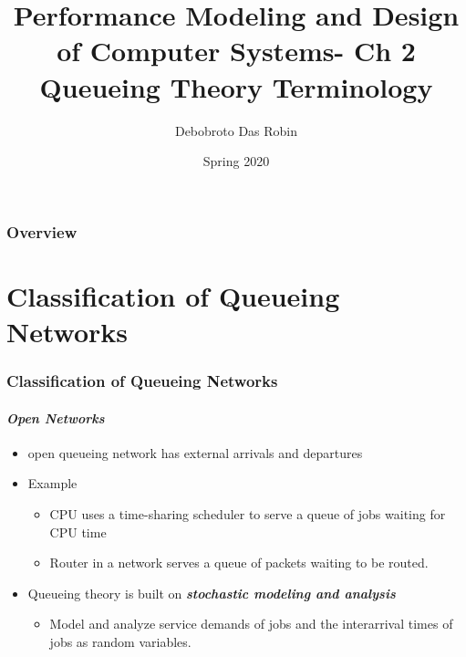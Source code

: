 \documentclass{beamer}
\title{Performance Modeling and
Design of Computer Systems- Ch 2 \\
Queueing Theory Terminology}
\author{Debobroto Das Robin} %
\institute{Kent State University}
\date{Spring 2020}
\begin{document}
\begin{frame}
        \titlepage
        \begin{center}
    \href{mailto:drobin@kent.edu}{}
        \end{center}
\end{frame}

\begin{frame}
\frametitle{Overview} %
\tableofcontents %
\end{frame}
\section{Classiﬁcation of Queueing Networks}

\begin{frame}
    \frametitle{Classiﬁcation of Queueing Networks}
    \framesubtitle{\textbf{\textit{Open Networks}}}
	\begin{itemize}
		\item open queueing network has external arrivals and departures
		\item Example
			\begin{itemize}
			\item CPU uses a time-sharing scheduler to serve a queue of jobs waiting for CPU time
			\item Router in a network serves a queue of packets waiting to be routed.
			\end{itemize}
		\item Queueing theory is built on  \textbf{\textit{stochastic modeling and analysis}} 						\begin{itemize}
					\item Model and analyze  service demands of jobs and the interarrival times of 							jobs as random 	variables. 
				\end{itemize}		  
	\end{itemize}	    
    
\end{frame}
\end{document}
